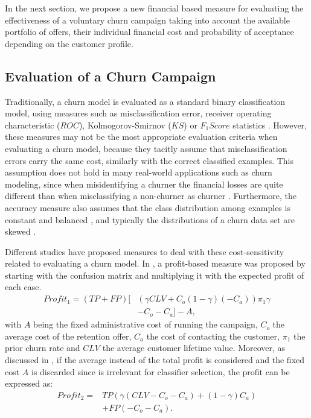 In the next section, we propose a new financial based measure for evaluating the effectiveness of 
a voluntary churn campaign taking into account the available portfolio of offers, their 
individual 	financial cost and probability of acceptance depending on the customer profile. 


\subsection{Evaluation of a Churn Campaign}
\label{sec:4:1:evaluation}
	
Traditionally, a churn model is evaluated as a standard binary classification model, 
using measures such as misclassification error, receiver operating characteristic ($ROC$),  
Kolmogorov-Smirnov ($KS$) or \mbox{$F_1Score$} statistics \citep{Verbeke2012}.
However, these measures may not be the most appropriate evaluation criteria when  
evaluating a churn model, because they tacitly assume that misclassification errors carry the 
same cost, similarly with the correct classified examples. This assumption does not hold in many 
real-world applications such as churn modeling, since  when misidentifying a churner the financial 
losses are quite different than when misclassifying a non-churner as churner \citep{Glady2009}. 
Furthermore, the accuracy measure also assumes that the class distribution 
among examples is constant and balanced \citep{Provost1998}, and typically the distributions of a 
churn data set are skewed \citep{Verbeke2012}.

Different studies have proposed measures to deal with these cost-sensitivity related to
evaluating a churn model. In \citep{Neslin2006}, a profit-based measure was proposed by starting 
with the confusion matrix and multiplying it with the expected profit of each case.
\begin{align}\label{eq:4:profit1}
 Profit_1 = (TP+FP)\bigg[ & \left(\gamma CLV + C_o(1-\gamma)(-C_a)\right)\pi_1\gamma \nonumber \\
 & -C_o-C_a\bigg]-A,
\end{align}
with $A$ being the fixed administrative cost of running the campaign, $C_o$ the average cost of the 
retention offer, $C_a$ the cost of contacting the customer, $\pi_1$ the prior churn rate and $CLV$ 
the average customer lifetime value.
Moreover, as discussed in \citep{Verbraken2013}, if the average instead of the total profit is 
considered and the fixed cost $A$ is discarded since is irrelevant for classifier selection, the 
profit can be expressed as:
\begin{align}\label{eq:4:profit2}
 Profit_2 = &TP\left(\gamma(CLV-C_o-C_a)+(1-\gamma)C_a \right) \nonumber \\
 &+FP(-C_o-C_a).
\end{align}

